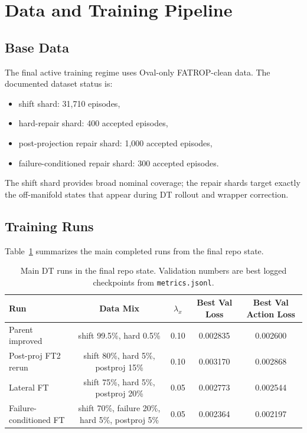 \section{Data and Training Pipeline}

\subsection{Base Data}

The final active training regime uses Oval-only FATROP-clean data. The documented dataset status is:
\begin{itemize}
\item shift shard: 31,710 episodes,
\item hard-repair shard: 400 accepted episodes,
\item post-projection repair shard: 1,000 accepted episodes,
\item failure-conditioned repair shard: 300 accepted episodes.
\end{itemize}

The shift shard provides broad nominal coverage; the repair shards target exactly the off-manifold states that appear during DT rollout and wrapper correction.

\subsection{Training Runs}

Table~\ref{tab:training-runs} summarizes the main completed runs from the final repo state.

\begin{table}[t]
\centering
\caption{Main DT runs in the final repo state. Validation numbers are best logged checkpoints from \texttt{metrics.jsonl}.}
\label{tab:training-runs}
\begin{tabular}{lcccc}
\toprule
Run & Data Mix & $\lambda_x$ & Best Val Loss & Best Val Action Loss \\
\midrule
Parent improved & shift 99.5\%, hard 0.5\% & 0.10 & 0.002835 & 0.002600 \\
Post-proj FT2 rerun & shift 80\%, hard 5\%, postproj 15\% & 0.10 & 0.003170 & 0.002868 \\
Lateral FT & shift 75\%, hard 5\%, postproj 20\% & 0.05 & 0.002773 & 0.002544 \\
Failure-conditioned FT & shift 70\%, failure 20\%, hard 5\%, postproj 5\% & 0.05 & 0.002364 & 0.002197 \\
\bottomrule
\end{tabular}
\end{table}

